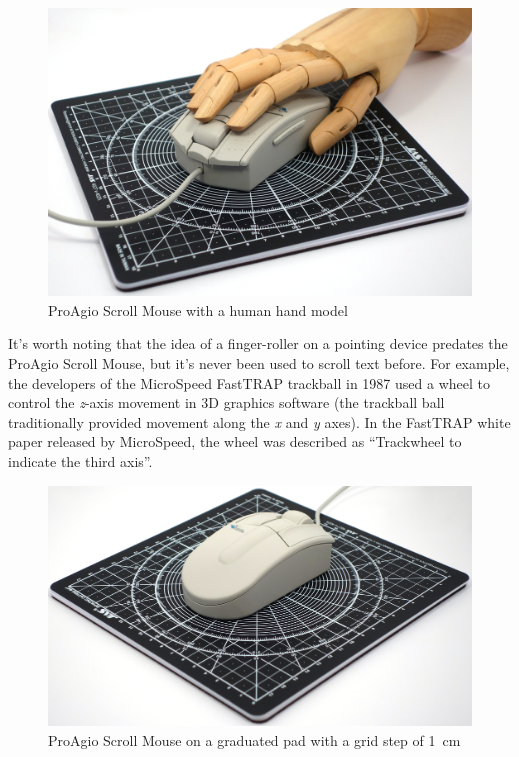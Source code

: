 \documentclass[11pt, a4paper]{article}
\begin{document}
\begin{figure}[h]
    \centering
    \includegraphics[scale=0.3]{1995_pro_agio_scroll_mouse/hand_30.jpg}
    \caption{ProAgio Scroll Mouse with a human hand model}
    \label{fig:ScrollHand}
    \end{figure}

It's worth noting that the idea of a finger-roller on a pointing device predates the ProAgio Scroll Mouse, but it's never been used to scroll text before. For example, the developers of the MicroSpeed FastTRAP trackball in 1987 used a wheel to control the \textit{z}-axis movement in 3D graphics software (the trackball ball traditionally provided movement along the \textit{x} and \textit{y} axes). In the FastTRAP white paper released by MicroSpeed, the wheel was described as “Trackwheel to indicate the third axis”.

\begin{figure}[h]
    \centering
    \includegraphics[scale=0.37]{1995_pro_agio_scroll_mouse/size_30.jpg}
    \caption{ProAgio Scroll Mouse on a graduated pad with a grid step of 1~cm}
    \label{fig:ScrollSize}
\end{figure}
\end{document}
